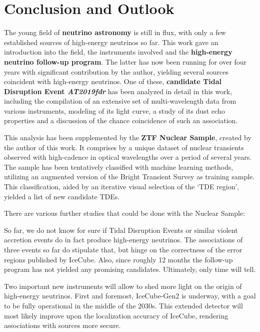 \chapter{Conclusion and Outlook}\label{conclusion}
The young field of \textbf{neutrino astronomy} is still in flux, with only a few established sources of high-energy neutrinos so far. This work gave an introduction into the field, the instruments involved and the \textbf{high-energy neutrino follow-up program}. The latter has now been running for over four years with significant contribution by the author, yielding several sources coincident with high-energy neutrinos. One of these, \textbf{candidate Tidal Disruption Event \textit{AT2019fdr}} has been analyzed in detail in this work, including the compilation of an extensive set of multi-wavelength data from various instruments, modeling of its light curve, a study of its dust echo properties and a discussion of the chance coincidence of such an association.

This analysis has been supplemented by the \textbf{ZTF Nuclear Sample}, created by the author of this work. It comprises by a unique dataset of nuclear transients observed with high-cadence in optical wavelengths over a period of several years. The sample has been tentatively classified with machine learning methods, utilizing an augmented version of the Bright Transient Survey as training sample. This classification, aided by an iterative visual selection of the `TDE region', yielded a list of new candidate TDEs.

There are various further studies that could be done with the Nuclear Sample:

So far, we do not know for sure if Tidal Disruption Events or similar violent accretion events do in fact produce high-energy neutrinos. The associations of three events so far do stipulate that, but hinge on the correctness of the error regions published by IceCube. Also, since roughly 12 months the follow-up program has not yielded any promising candidates. Ultimately, only time will tell.

Two important new instruments will allow to shed more light on the origin of high-energy neutrinos. First and foremost, IceCube-Gen2  is underway, with a goal to be fully operational in the middle of the 2030s. This extended detector will most likely improve upon the localization accuracy of IceCube, rendering associations with sources more secure.